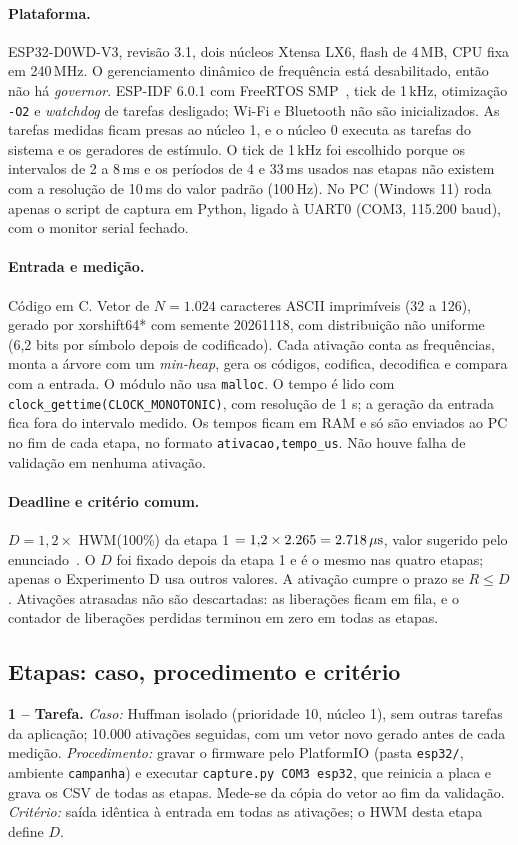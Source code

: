 \documentclass[11pt,a4paper]{article}
\newcommand{\us}{\ifmmode\,\mu\mathrm{s}\else\,\textmu s\fi}
\newcommand{\ms}{\,ms}
\begin{document}
\paragraph{Plataforma.} ESP32-D0WD-V3, revisão 3.1, dois núcleos Xtensa LX6,
flash de 4\,MB, CPU fixa em 240\,MHz. O gerenciamento dinâmico de frequência
está desabilitado, então não há \textit{governor}. ESP-IDF 6.0.1 com FreeRTOS
SMP~\cite{espidf}, tick de 1\,kHz, otimização \texttt{-O2} e \textit{watchdog}
de tarefas desligado; Wi-Fi e Bluetooth não são inicializados. As tarefas
medidas ficam presas ao núcleo 1, e o núcleo 0 executa as tarefas do sistema e
os geradores de estímulo. O tick de 1\,kHz foi escolhido porque os intervalos
de 2 a 8\ms{} e os períodos de 4 e 33\ms{} usados nas etapas não existem com a
resolução de 10\ms{} do valor padrão (100\,Hz). No PC (Windows 11) roda apenas
o script de captura em Python, ligado à UART0 (COM3, 115.200 baud), com o
monitor serial fechado.

\paragraph{Entrada e medição.} Código em C. Vetor de $N = 1.024$ caracteres
ASCII imprimíveis (32 a 126), gerado por xorshift64* com semente 20261118, com
distribuição não uniforme (6,2 bits por símbolo depois de codificado). Cada
ativação conta as frequências, monta a árvore com um \textit{min-heap}, gera os
códigos, codifica, decodifica e compara com a entrada. O módulo não usa
\texttt{malloc}. O tempo é lido com \texttt{clock\_gettime(CLOCK\_MONOTONIC)},
com resolução de 1\us; a geração da entrada fica fora do intervalo medido. Os
tempos ficam em RAM e só são enviados ao PC no fim de cada etapa, no formato
\texttt{ativacao,tempo\_us}. Não houve falha de validação em nenhuma ativação.

\paragraph{Deadline e critério comum.} $D = 1{,}2 \times$ HWM(100\%) da
etapa 1 $= 1{,}2 \times 2.265 = 2.718\us$, valor sugerido pelo
enunciado~\cite{enunciado}. O $D$ foi fixado depois da etapa 1 e é o mesmo nas
quatro etapas; apenas o Experimento D usa outros valores. A ativação cumpre o
prazo se $R \le D$. Ativações atrasadas não são descartadas: as liberações
ficam em fila, e o contador de liberações perdidas terminou em zero em todas as
etapas.

\subsection{Etapas: caso, procedimento e critério}
\textbf{1 -- Tarefa.} \textit{Caso:} Huffman isolado (prioridade 10, núcleo 1),
sem outras tarefas da aplicação; 10.000 ativações seguidas, com um vetor novo
gerado antes de cada medição. \textit{Procedimento:} gravar o firmware pelo
PlatformIO (pasta \texttt{esp32/}, ambiente \texttt{campanha}) e executar
\texttt{capture.py COM3 esp32}, que reinicia a placa e grava os CSV de todas as
etapas. Mede-se da
cópia do vetor ao fim da validação. \textit{Critério:} saída idêntica à
entrada em todas as ativações; o HWM desta etapa define $D$.
\end{document}
